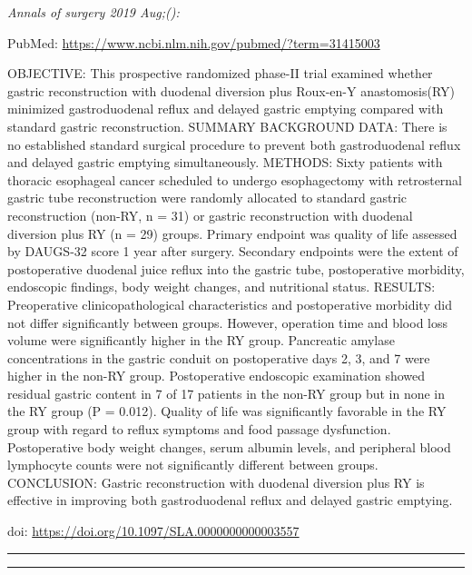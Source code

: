 \documentclass[]{article}
\begin{document}
\emph{Annals of surgery 2019 Aug;():}

PubMed: \url{https://www.ncbi.nlm.nih.gov/pubmed/?term=31415003}

OBJECTIVE: This prospective randomized phase-II trial examined whether
gastric reconstruction with duodenal diversion plus Roux-en-Y
anastomosis(RY) minimized gastroduodenal reflux and delayed gastric
emptying compared with standard gastric reconstruction. SUMMARY
BACKGROUND DATA: There is no established standard surgical procedure to
prevent both gastroduodenal reflux and delayed gastric emptying
simultaneously. METHODS: Sixty patients with thoracic esophageal cancer
scheduled to undergo esophagectomy with retrosternal gastric tube
reconstruction were randomly allocated to standard gastric
reconstruction (non-RY, n = 31) or gastric reconstruction with duodenal
diversion plus RY (n = 29) groups. Primary endpoint was quality of life
assessed by DAUGS-32 score 1 year after surgery. Secondary endpoints
were the extent of postoperative duodenal juice reflux into the gastric
tube, postoperative morbidity, endoscopic findings, body weight changes,
and nutritional status. RESULTS: Preoperative clinicopathological
characteristics and postoperative morbidity did not differ significantly
between groups. However, operation time and blood loss volume were
significantly higher in the RY group. Pancreatic amylase concentrations
in the gastric conduit on postoperative days 2, 3, and 7 were higher in
the non-RY group. Postoperative endoscopic examination showed residual
gastric content in 7 of 17 patients in the non-RY group but in none in
the RY group (P = 0.012). Quality of life was significantly favorable in
the RY group with regard to reflux symptoms and food passage
dysfunction. Postoperative body weight changes, serum albumin levels,
and peripheral blood lymphocyte counts were not significantly different
between groups. CONCLUSION: Gastric reconstruction with duodenal
diversion plus RY is effective in improving both gastroduodenal reflux
and delayed gastric emptying.

doi: \url{https://doi.org/10.1097/SLA.0000000000003557}

{}

{}

\begin{center}\rule{0.5\linewidth}{\linethickness}\end{center}

\begin{center}\rule{0.5\linewidth}{\linethickness}\end{center}
\end{document}

